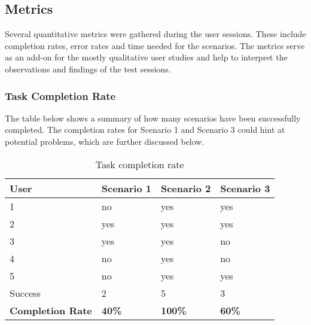 
\subsection{Metrics}
Several quantitative metrics were gathered during the user sessions. These include completion rates, error rates and time needed for the scenarios. The metrics serve as an add-on for the mostly qualitative user studies and help to interpret the observations and findings of the test sessions.

\subsubsection{Task Completion Rate}
The table below shows a summary of how many scenarios have been successfully completed. The completion rates for Scenario 1 and Scenario 3 could hint at potential problems, which are further discussed below.

\begin{table}[h!]
\begin{tabular}{|l|l|l|l|}
\hline
\rowcolor[HTML]{EFEFEF}
{\bf User}                     & {\bf Scenario 1} & {\bf Scenario 2} & {\bf Scenario 3} \\ \hline
1                              & no           & yes          & yes          \\ \hline
2                              & yes          & yes          & yes          \\ \hline
3                              & yes          & yes          & no           \\ \hline
4                              & no           & yes          & no      \\ \hline
5                              & no      & yes          & yes          \\ \hline
\rowcolor[HTML]{EFEFEF}
Success & 2 & 5 & 3 \\ \hline
\rowcolor[HTML]{EFEFEF}
{\bf Completion Rate} & {\bf 40\%}   & {\bf 100\%}  & {\bf 60\%}   \\ \hline
\end{tabular}
\centering
\caption{Task completion rate}
\label{table:task-completion-rate}
\end{table}

